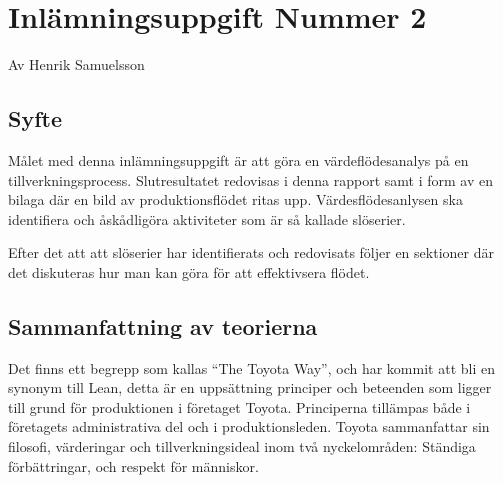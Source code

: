 \documentclass{article}
\begin{document}
\section*{Inlämningsuppgift Nummer 2}
Av Henrik Samuelsson
\subsection*{Syfte}
Målet med denna inlämningsuppgift är att göra en värdeflödesanalys på en tillverkningsprocess. Slutresultatet redovisas i denna rapport samt i form av en bilaga där en bild av produktionsflödet ritas upp. Värdesflödesanlysen ska identifiera och åskådligöra aktiviteter som är så kallade slöserier.

Efter det att att slöserier har identifierats och redovisats följer en sektioner där det diskuteras hur man kan göra för att effektivsera flödet.

\subsection*{Sammanfattning av teorierna}
Det finns ett begrepp som kallas ``The Toyota Way'', och har kommit att bli en synonym till Lean, detta är en uppsättning principer och beteenden som ligger till grund för produktionen i företaget Toyota. Principerna tillämpas både i företagets administrativa del och i produktionsleden. Toyota sammanfattar sin filosofi, värderingar och tillverkningsideal inom två nyckelområden: Ständiga förbättringar, och respekt för människor.
\end{document}
